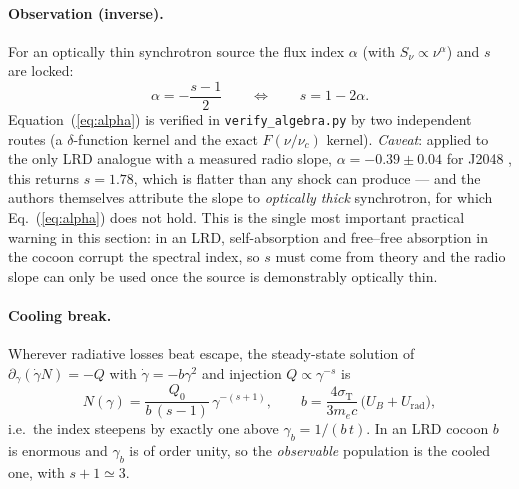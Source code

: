 \documentclass[11pt,a4paper]{article}
\begin{document}
\paragraph{Observation (inverse).} For an optically thin synchrotron source the
flux index $\alpha$ (with $S_\nu\propto\nu^{\alpha}$) and $s$ are locked:
\begin{equation}
  \alpha = -\frac{s-1}{2}
  \qquad\Longleftrightarrow\qquad
  s = 1-2\alpha .
  \label{eq:alpha}
\end{equation}
Equation~(\ref{eq:alpha}) is verified in \texttt{verify\_algebra.py} by two
independent routes (a $\delta$-function kernel and the exact $F(\nu/\nu_c)$
kernel). \emph{Caveat}: applied to the only LRD analogue with a measured radio
slope, $\alpha=-0.39\pm0.04$ for J2048 \citep{Rodriguez2026}, this returns
$s=1.78$, which is flatter than any shock can produce --- and the authors
themselves attribute the slope to \emph{optically thick} synchrotron, for which
Eq.~(\ref{eq:alpha}) does not hold. This is the single most important practical
warning in this section: in an LRD, self-absorption and free--free absorption in
the cocoon corrupt the spectral index, so $s$ must come from theory and the
radio slope can only be used once the source is demonstrably optically thin.

\paragraph{Cooling break.} Wherever radiative losses beat escape, the
steady-state solution of $\partial_\gamma(\dot\gamma N)=-Q$ with
$\dot\gamma=-b\gamma^{2}$ and injection $Q\propto\gamma^{-s}$ is
\begin{equation}
  N(\gamma)=\frac{Q_0}{b\,(s-1)}\,\gamma^{-(s+1)},
  \qquad
  b=\frac{4\sigma_{\mathrm T}}{3m_ec}\,\bigl(U_B+U_{\mathrm{rad}}\bigr),
  \label{eq:cool}
\end{equation}
i.e.\ the index steepens by exactly one above
$\gamma_b=1/(b\,t)$. In an LRD cocoon $b$ is enormous and $\gamma_b$ is of order
unity, so the \emph{observable} population is the cooled one, with $s+1\simeq3$.
\end{document}
